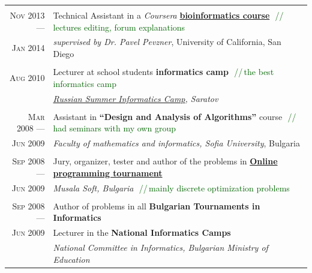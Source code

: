\documentclass[a4paper,10pt]{article}
\def\myline{\color{linegray}\vline}
\newcommand{\minorcolor}[1]{\textcolor{mygray}{#1}}
\newcommand{\comment}[1]{\small\textcolor{darkgreen}{\,\,//\,#1}}
\newcommand{\mydate}[1]{\minorcolor{\textsc{#1}}}
\begin{document}
{\begin{tabular}{r!{\myline}p{14cm}}
        \\
        \mydate{Nov 2013 ---}       &   Technical Assistant in a \textit{Coursera} \textbf{\href{https://www.coursera.org/course/bioinformatics}{bioinformatics course}}
                                        \comment{lectures editing, forum explanations}\\
        \mydate{Jan 2014}           &   \textit{supervised by Dr. Pavel Pevzner}, University of California, San Diego\\
	
        \\
        \mydate{Aug 2010}           &   Lecturer at school students \textbf{informatics camp}
                                        \comment{the best informatics camp}\\
                                    &   \textit{\href{http://lksh.ru/}{Russian Summer Informatics Camp}, Saratov}\\
	
	\\
	\mydate{Mar 2008 ---}       &   Assistant in \textbf{``Design and Analysis of Algorithms''} course
                                        \comment{had seminars with my own group}\\
	\mydate{Jun 2009}           &   \textit{Faculty of mathematics and informatics, Sofia University}, Bulgaria\\

	\\
	\mydate{Sep 2008 ---}       &   Jury, organizer, tester and author of the problems in \textbf{\href{http://konkurs.musala.com/}{Online programming tournament}}\\
        \mydate{Jun 2009}           &   \textit{Musala Soft, Bulgaria}
                                        \comment{mainly discrete optimization problems}\\

	\\
	\mydate{Sep 2008 ---}       &   Author of problems in all \textbf{Bulgarian Tournaments in Informatics}\\
	\mydate{Jun 2009}           &   Lecturer in the \textbf{National Informatics Camps}\\
                                    &   \textit{National Committee in Informatics, Bulgarian Ministry of Education}\\
\end{tabular}


}
\end{document}
